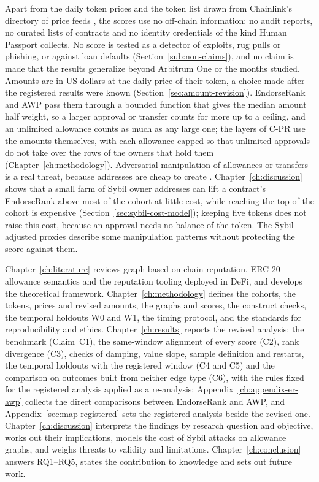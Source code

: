 Apart from the daily token prices and the token list drawn from Chainlink's directory of price feeds \parencite{chainlinknddatafeeds}, the scores use no off-chain information: no audit reports, no curated lists of contracts and no identity credentials of the kind Human Passport collects. No score is tested as a detector of exploits, rug pulls or phishing, or against loan defaults (Section~\ref{sub:non-claims}), and no claim is made that the results generalize beyond Arbitrum One or the months studied. Amounts are in US dollars at the daily price of their token, a choice made after the registered results were known (Section~\ref{sec:amount-revision}). EndorseRank and AWP pass them through a bounded function that gives the median amount half weight, so a larger approval or transfer counts for more up to a ceiling, and an unlimited allowance counts as much as any large one; the layers of C-PR use the amounts themselves, with each allowance capped so that unlimited approvals do not take over the rows of the owners that hold them (Chapter~\ref{ch:methodology}). Adversarial manipulation of allowances or transfers is a real threat, because addresses are cheap to create \parencite{douceur2002sybil}. Chapter~\ref{ch:discussion} shows that a small farm of Sybil owner addresses can lift a contract's EndorseRank above most of the cohort at little cost, while reaching the top of the cohort is expensive (Section~\ref{sec:sybil-cost-model}); keeping five tokens does not raise this cost, because an approval needs no balance of the token. The Sybil-adjusted proxies describe some manipulation patterns without protecting the score against them.


Chapter~\ref{ch:literature} reviews graph-based on-chain reputation, ERC-20 allowance semantics and the reputation tooling deployed in DeFi, and develops the theoretical framework. Chapter~\ref{ch:methodology} defines the cohorts, the tokens, prices and revised amounts, the graphs and scores, the construct checks, the temporal holdouts W0 and W1, the timing protocol, and the standards for reproducibility and ethics. Chapter~\ref{ch:results} reports the revised analysis: the benchmark (Claim~C1), the same-window alignment of every score (C2), rank divergence (C3), checks of damping, value slope, sample definition and restarts, the temporal holdouts with the registered window (C4 and C5) and the comparison on outcomes built from neither edge type (C6), with the rules fixed for the registered analysis applied as a re-analysis; Appendix~\ref{ch:appendix-er-awp} collects the direct comparisons between EndorseRank and AWP, and Appendix~\ref{sec:map-registered} sets the registered analysis beside the revised one. Chapter~\ref{ch:discussion} interprets the findings by research question and objective, works out their implications, models the cost of Sybil attacks on allowance graphs, and weighs threats to validity and limitations. Chapter~\ref{ch:conclusion} answers RQ1--RQ5, states the contribution to knowledge and sets out future work.
